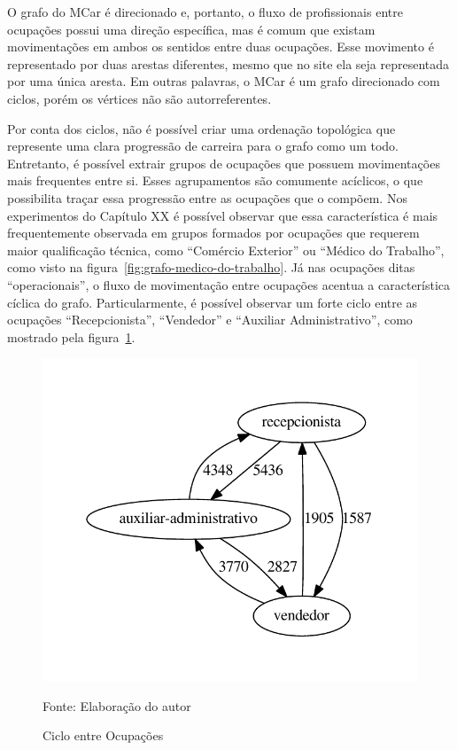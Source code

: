 \documentclass[12pt,a4paper,final]{article}
\newcommand{\source}[1]{\vspace{-10pt} \caption*{Fonte: {#1}} }
\begin{document}
O grafo do MCar é direcionado e, portanto, o fluxo de profissionais entre ocupações possui uma direção específica, mas é comum que existam movimentações em ambos os sentidos entre duas ocupações. Esse movimento é representado por duas arestas diferentes, mesmo que no site ela seja representada por uma única aresta. Em outras palavras, o MCar é um grafo direcionado com ciclos, porém os vértices não são autorreferentes.

Por conta dos ciclos, não é possível criar uma ordenação topológica que represente uma clara progressão de carreira para o grafo como um todo. Entretanto, é possível extrair grupos de ocupações que possuem movimentações mais frequentes entre si. Esses agrupamentos são comumente acíclicos, o que possibilita traçar essa progressão entre as ocupações que o compõem. Nos experimentos do Capítulo XX é possível observar que essa característica é mais frequentemente observada em grupos formados por ocupações que requerem maior qualificação técnica, como \enquote{Comércio Exterior} ou \enquote{Médico do Trabalho}, como visto na figura~\ref{fig:grafo-medico-do-trabalho}. Já nas ocupações ditas \enquote{operacionais}, o fluxo de movimentação entre ocupações acentua a característica cíclica do grafo. Particularmente, é possível observar um forte ciclo entre as ocupações \enquote{Recepcionista}, \enquote{Vendedor} e \enquote{Auxiliar Administrativo}, como mostrado pela figura~\ref{fig:grafo-ciclo-operacional}.

\begin{figure}[ht]
  \centering
  \includegraphics[scale=0.8]{ciclo-operacional.pdf}
  \caption{Ciclo entre Ocupações}
  \source{Elaboração do autor}
  \label{fig:grafo-ciclo-operacional}
\end{figure}
\end{document}
